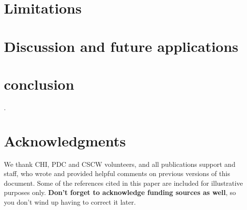 \documentclass{sigchi}
\begin{document}
\section {Limitations}


\section {Discussion and future applications}

\section {conclusion}
 \cite{Kim:2015ii}.



\section{Acknowledgments}

We thank CHI, PDC and CSCW volunteers, and all publications support
and staff, who wrote and provided helpful comments on previous
versions of this document.  Some of the references cited in this paper
are included for illustrative purposes only.  \textbf{Don't forget
to acknowledge funding sources as well}, so you don't wind up
having to correct it later.

%
%
%
%
%
\balance



\end{document}
